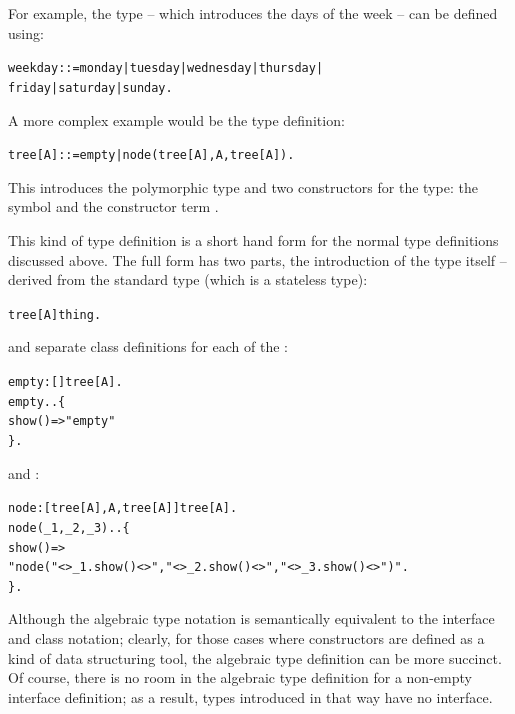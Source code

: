For example, the  type -- which introduces the days of the week -- can be defined using:
\begin{alltt}
weekday ::= monday | tuesday | wednesday | thursday |
            friday | saturday | sunday.
\end{alltt}

A more complex example would be the  type definition:
\begin{alltt}
tree[A] ::= empty | node(tree[A],A,tree[A]).
\end{alltt}
This introduces the polymorphic  type and two constructors for the type: the symbol  and the constructor term .

This kind of type definition is a short hand form for the normal type definitions discussed above. The full form has two parts, the introduction of the type itself -- derived from the  standard type (which is a stateless type):
\begin{alltt}
tree[A] \impl thing.
\end{alltt}
and separate class definitions for each of the :
\begin{alltt}
empty:[]\conarrow tree[A].
empty..\{
  show()=>"empty"
\}.
\end{alltt}
and :
\begin{alltt}
node:[tree[A],A,tree[A]]\conarrow tree[A].
node(\_1,\_2,\_3)..\{
  show()=>
    "node("<>\_1.show()<>","<>\_2.show()<>","<>\_3.show()<>")".
\}.
\end{alltt}
Although the algebraic type notation is semantically equivalent to the interface and class notation; clearly, for those cases where constructors are defined as a kind of data structuring tool, the algebraic type definition can be more succinct. Of course, there is no room in the algebraic type definition for a non-empty interface definition; as a result, types introduced in that way have no interface.

